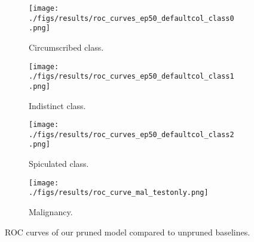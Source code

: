 \documentclass[11pt]{article}
\begin{document}
\begin{figure}
    \centering
        \begin{subfigure}{0.48\textwidth}
        \texttt{[image: ./figs/results/roc\_curves\_ep50\_defaultcol\_class0.png]}
        \caption{Circumscribed class.}
        \end{subfigure}
        \hfil
        \begin{subfigure}{0.48\textwidth}
        \texttt{[image: ./figs/results/roc\_curves\_ep50\_defaultcol\_class1.png]}
        \caption{Indistinct class.}
        \end{subfigure}
        
        \begin{subfigure}{0.48\textwidth}
        \texttt{[image: ./figs/results/roc\_curves\_ep50\_defaultcol\_class2.png]}
        \caption{Spiculated class.}
        \end{subfigure}
        \hfil
        \begin{subfigure}{0.48\textwidth}
        \texttt{[image: ./figs/results/roc\_curve\_mal\_testonly.png]}
        \caption{Malignancy.}
        \end{subfigure}
        
    \caption{ROC curves of our pruned model compared to unpruned baselines.}
    \label{fig:roc_massmargin_results}
\end{figure}
\end{document}
